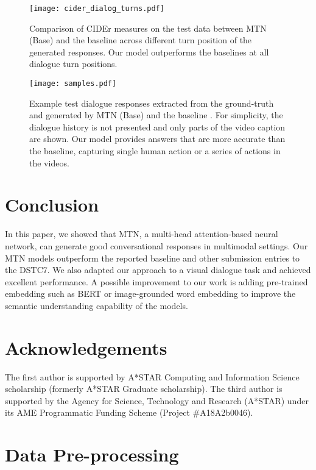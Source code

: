 \documentclass[11pt,a4paper]{article}
\begin{document}
\begin{figure}[htbp]
	\centering
	\texttt{[image: cider\_dialog\_turns.pdf]}
	\caption{Comparison of CIDEr measures on the test data between MTN (Base) and the baseline \cite{hori2018end} across different turn position of the generated responses. Our model outperforms the baselines at all dialogue turn positions.}
	\label{fig:cider_turns}
\end{figure}

\begin{figure*}[htbp]
	\centering
	\resizebox{1.0\textwidth}{!} {
	\texttt{[image: samples.pdf]}
	}
	\caption{Example test dialogue responses extracted from the ground-truth  and generated by MTN (Base)  and the baseline \cite{hori2018end} . For simplicity, the dialogue history is not presented and only parts of the video caption  are shown. Our model provides answers that are more accurate than the baseline, capturing single human action or a series of actions in the videos.}
	\label{fig:samples}
\end{figure*}

\section{Conclusion}
In this paper, we showed that MTN, a multi-head attention-based neural network, can generate good conversational responses in multimodal settings. 
Our MTN models outperform the reported baseline and other submission entries to the DSTC7. We also adapted our approach to a visual dialogue task and achieved excellent performance. 
A possible improvement to our work is adding pre-trained embedding such as BERT \cite{devlin2018bert} or image-grounded word embedding \cite{kiros2018illustrative} to improve the semantic understanding capability of the models. 

\section*{Acknowledgements}
The first author is supported by A*STAR Computing and Information Science scholarship (formerly A*STAR Graduate scholarship). The third author is supported by the Agency for Science, Technology and Research (A*STAR) under its AME Programmatic Funding Scheme (Project \#A18A2b0046).




\appendix 

\section{Data Pre-processing}
\end{document}
